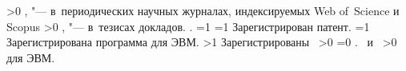 {\begin{refsection}
        \ifnum \value{citeauthorscopuswos}>0%
            ,  "--- в~периодических научных журналах, индексируемых Web of~Science и Scopus\sloppy%
        \fi%
        \ifnum \value{citeauthorconf}>0%
            ,  "--- в~тезисах докладов.
        \else%
            .
        \fi%
        \ifnum \value{citeregistered}=1%
            \ifnum \value{citeauthorpatent}=1%
                Зарегистрирован  патент.
            \fi%
            \ifnum \value{citeauthorprogram}=1%
                Зарегистрирована  программа для ЭВМ.
            \fi%
        \fi%
        \ifnum \value{citeregistered}>1%
            Зарегистрированы\ %
            \ifnum \value{citeauthorpatent}>0%
            \sloppy%
            \ifnum \value{citeauthorprogram}=0 . \else \ и~\fi%
            \fi%
            \ifnum \value{citeauthorprogram}>0%
             для ЭВМ.
            \fi%
        \fi%
    \end{refsection}%
    \begin{refsection}
        \nocite{vakbib2}%
        \nocite{patbib1}%
        \nocite{progbib1}%
        \nocite{bib1}%
        \nocite{confbib1}%
    \end{refsection}%
}

